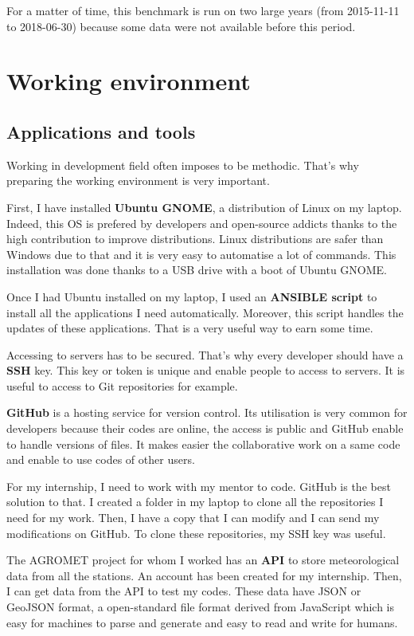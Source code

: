 \documentclass[12pt,twoside]{reedthesis}
\theoremstyle{definition}
\theoremstyle{definition}
\theoremstyle{definition}
\theoremstyle{remark}
\begin{document}
For a matter of time, this benchmark is run on two large years (from
2015-11-11 to 2018-06-30) because some data were not available before
this period.

\chapter{Working environment}\label{workenv}

\section{Applications and tools}\label{applications-and-tools}

Working in development field often imposes to be methodic. That's why
preparing the working environment is very important.

First, I have installed \textbf{Ubuntu GNOME}, a distribution of Linux
on my laptop. Indeed, this OS is prefered by developers and open-source
addicts thanks to the high contribution to improve distributions. Linux
distributions are safer than Windows due to that and it is very easy to
automatise a lot of commands. This installation was done thanks to a USB
drive with a boot of Ubuntu GNOME.

Once I had Ubuntu installed on my laptop, I used an \textbf{ANSIBLE
script} to install all the applications I need automatically. Moreover,
this script handles the updates of these applications. That is a very
useful way to earn some time.

Accessing to servers has to be secured. That's why every developer
should have a \textbf{SSH} key. This key or token is unique and enable
people to access to servers. It is useful to access to Git repositories
for example.

\textbf{GitHub} is a hosting service for version control. Its
utilisation is very common for developers because their codes are
online, the access is public and GitHub enable to handle versions of
files. It makes easier the collaborative work on a same code and enable
to use codes of other users.

For my internship, I need to work with my mentor to code. GitHub is the
best solution to that. I created a folder in my laptop to clone all the
repositories I need for my work. Then, I have a copy that I can modify
and I can send my modifications on GitHub. To clone these repositories,
my SSH key was useful.

The AGROMET project for whom I worked has an \textbf{API} to store
meteorological data from all the stations. An account has been created
for my internship. Then, I can get data from the API to test my codes.
These data have JSON or GeoJSON format, a open-standard file format
derived from JavaScript which is easy for machines to parse and generate
and easy to read and write for humans.
\end{document}
